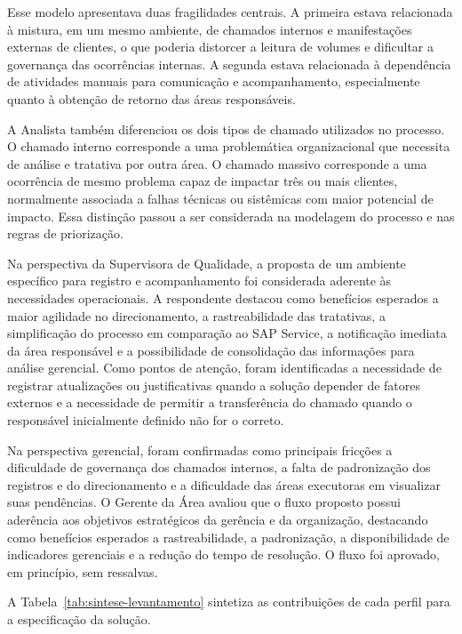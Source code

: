 Esse modelo apresentava duas fragilidades centrais. A
primeira estava relacionada à mistura, em um mesmo ambiente,
de chamados internos e manifestações externas de clientes,
o que poderia distorcer a leitura de volumes e dificultar a
governança das ocorrências internas. A segunda estava
relacionada à dependência de atividades manuais para
comunicação e acompanhamento, especialmente quanto à
obtenção de retorno das áreas responsáveis.

A Analista também diferenciou os dois tipos de chamado
utilizados no processo. O chamado interno corresponde a uma
problemática organizacional que necessita de análise e
tratativa por outra área. O chamado massivo corresponde a
uma ocorrência de mesmo problema capaz de impactar três ou
mais clientes, normalmente associada a falhas técnicas ou
sistêmicas com maior potencial de impacto. Essa distinção
passou a ser considerada na modelagem do processo e nas
regras de priorização.

Na perspectiva da Supervisora de Qualidade, a proposta de
um ambiente específico para registro e acompanhamento foi
considerada aderente às necessidades operacionais. A
respondente destacou como benefícios esperados a maior
agilidade no direcionamento, a rastreabilidade das
tratativas, a simplificação do processo em comparação ao
SAP Service, a notificação imediata da área responsável e a
possibilidade de consolidação das informações para análise
gerencial. Como pontos de atenção, foram identificadas a
necessidade de registrar atualizações ou justificativas
quando a solução depender de fatores externos e a
necessidade de permitir a transferência do chamado quando o
responsável inicialmente definido não for o correto.

Na perspectiva gerencial, foram confirmadas como principais
fricções a dificuldade de governança dos chamados internos,
a falta de padronização dos registros e do direcionamento e
a dificuldade das áreas executoras em visualizar suas
pendências. O Gerente da Área avaliou que o fluxo proposto
possui aderência aos objetivos estratégicos da gerência e
da organização, destacando como benefícios esperados a
rastreabilidade, a padronização, a disponibilidade de
indicadores gerenciais e a redução do tempo de resolução.
O fluxo foi aprovado, em princípio, sem ressalvas.

A Tabela~\ref{tab:sintese-levantamento} sintetiza as
contribuições de cada perfil para a especificação da
solução.

